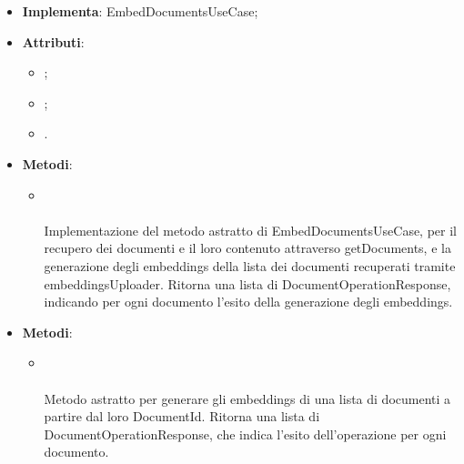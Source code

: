 \documentclass[10pt, a4paper]{article}
\begin{document}
\label{EmbedDocumentsServiceDettaglio}
\begin{itemize}
    \item \textbf{Implementa}: EmbedDocumentsUseCase;
    \item \textbf{Attributi}:
    \begin{itemize}
        \item {};
        \item {};
        \item {}.
    \end{itemize}
    \item \textbf{Metodi}:
    \begin{itemize}
        \item {}\\ \\
        Implementazione del metodo astratto di EmbedDocumentsUseCase, per il recupero dei documenti e il loro contenuto attraverso getDocuments, e la generazione degli embeddings della lista dei documenti recuperati tramite embeddingsUploader. Ritorna una lista di DocumentOperationResponse, indicando per ogni documento l'esito della generazione degli embeddings.
    \end{itemize}
\end{itemize}



\label{EmbedDocumentsUseCaseDettaglio}
\begin{itemize}
    \item \textbf{Metodi}:
    \begin{itemize}
        \item {}\\ \\
        Metodo astratto per generare gli embeddings di una lista di documenti a partire dal loro DocumentId. Ritorna una lista di DocumentOperationResponse, che indica l'esito dell'operazione per ogni documento.
    \end{itemize}
\end{itemize}
\end{document}
